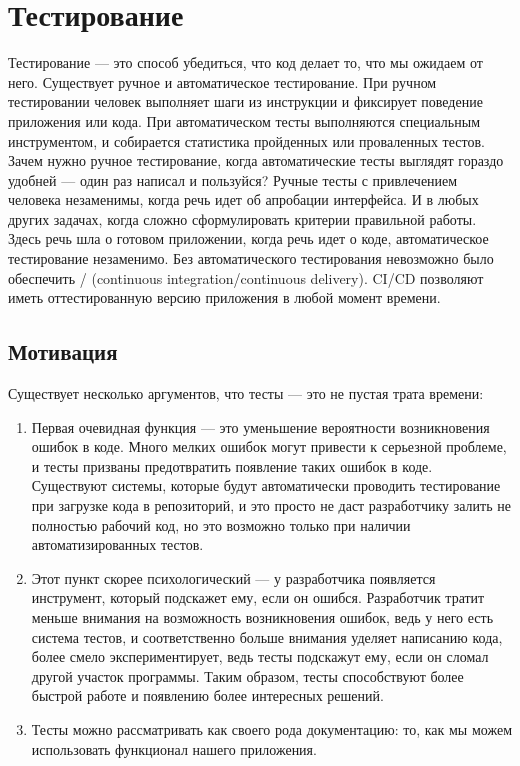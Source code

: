\documentclass[letterpaper,10pt,russian]{sphinxmanual}
\begin{document}
\section{Тестирование}
\label{\detokenize{educational_materials/testing/content:id1}}\label{\detokenize{educational_materials/testing/content::doc}}
\sphinxAtStartPar
Тестирование — это способ убедиться, что код делает то, что мы ожидаем от него. Существует ручное и автоматическое тестирование. При ручном тестировании человек выполняет шаги из инструкции и фиксирует поведение приложения или кода. При автоматическом тесты выполняются специальным инструментом, и собирается статистика пройденных или проваленных тестов.
Зачем нужно ручное тестирование, когда автоматические тесты выглядят гораздо удобней — один раз написал и пользуйся? Ручные тесты с привлечением человека незаменимы, когда речь идет об апробации интерфейса. И в любых других задачах, когда сложно сформулировать критерии правильной работы. Здесь речь шла о готовом приложении, когда речь идет о коде, автоматическое тестирование незаменимо. Без автоматического тестирования невозможно было обеспечить  / (continuous integration/continuous delivery). CI/CD позволяют иметь оттестированную версию приложения в любой момент времени.


\subsection{Мотивация}
\label{\detokenize{educational_materials/testing/content:id2}}
\sphinxAtStartPar
Существует несколько аргументов, что тесты — это не пустая трата времени:
\begin{enumerate}
%
\item {} 
\sphinxAtStartPar
Первая очевидная функция — это уменьшение вероятности возникновения ошибок в коде. Много мелких ошибок могут привести к серьезной проблеме, и тесты призваны предотвратить появление таких ошибок в коде. Существуют системы, которые будут автоматически проводить тестирование при загрузке кода в репозиторий, и это просто не даст разработчику залить не полностью рабочий код, но это возможно только при наличии автоматизированных тестов.

\item {} 
\sphinxAtStartPar
Этот пункт скорее психологический — у разработчика появляется инструмент, который подскажет ему, если он ошибся. Разработчик тратит меньше внимания на возможность возникновения ошибок, ведь у него есть система тестов, и соответственно больше внимания уделяет написанию кода, более смело экспериментирует, ведь тесты подскажут ему, если он сломал другой участок программы. Таким образом, тесты способствуют более быстрой работе и появлению более интересных решений.

\item {} 
\sphinxAtStartPar
Тесты можно рассматривать как своего рода документацию: то, как мы можем использовать функционал нашего приложения.

\end{enumerate}
\end{document}
